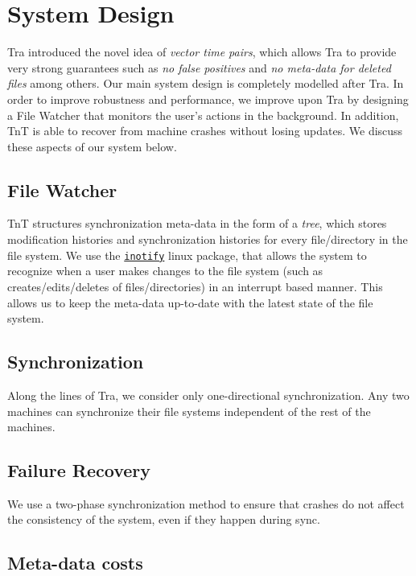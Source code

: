 \section{System Design}

Tra introduced the novel idea of {\em vector time pairs}, which allows Tra to provide very strong guarantees such as {\em no false positives} and {\em no meta-data for deleted files} among others. Our main system design is completely modelled after Tra.  In order to improve robustness and performance, we improve upon Tra by designing a File Watcher that monitors the user's actions in the background.  In addition, TnT is able to recover from machine crashes without losing updates.  We discuss these aspects of our system below.

\subsection{File Watcher}
TnT structures synchronization meta-data in the form of a {\em tree}, which stores modification histories and synchronization histories for every file/directory in the file system. We use the \href{http://godoc.org/code.google.com/p/go.exp/inotify}{\tt inotify} linux package, that allows the system to recognize when a user makes changes to the file system (such as creates/edits/deletes of files/directories) in an interrupt based manner. This allows us to keep the meta-data up-to-date with the latest state of the file system.

\subsection{Synchronization}
Along the lines of Tra, we consider only one-directional synchronization. Any two machines can synchronize their file systems independent of the rest of the machines.

\subsection{Failure Recovery}
We use a two-phase synchronization method to ensure that crashes do not affect the consistency of the system, even if they happen during sync.

\subsection{Meta-data costs}